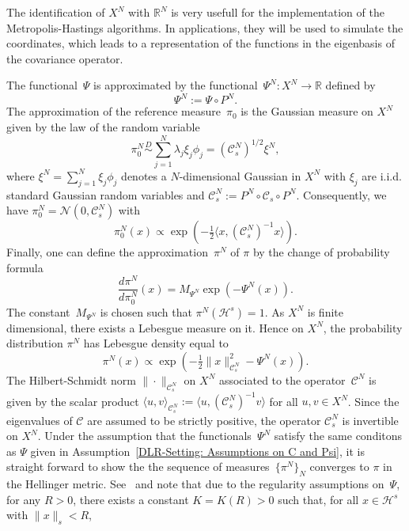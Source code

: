 \begin{rem}
 The identification of $X^N$ with $\mathbb{R}^N$ is very usefull for the implementation of the Metropolis-Hastings algorithms. In applications, they will be used to simulate the coordinates, which leads to a representation of the functions in the eigenbasis of the covariance operator.
\end{rem}

The functional~$\Psi$ is approximated by the functional~$\Psi^N : X^N \to \mathbb{R}$ defined by
\begin{equation}
\label{DLR-Setting: Definition Psi^N}
 \Psi^N := \Psi \circ P^N.
\end{equation}
The approximation of the reference measure~$\pi_0$ is the Gaussian measure on $X^N$ given by the law of the random variable
\begin{equation*}
 \pi^N_0 \stackrel{D}{\sim} \sum_{j=1}^{N} \lambda_j \xi_j \phi_j = (\mathcal{C}^N_s)^{1/2} \xi^N, 
\end{equation*}
where $\xi^N = \sum_{j=1}^{N} \xi_j \phi_j$ denotes a $N$-dimensional Gaussian in $X^N$ with $\xi_j$ are i.i.d.\,standard Gaussian random variables and  $\mathcal{C}_s^N :=P^N \circ \mathcal{C}_s \circ P^N $. Consequently, we have $\pi_0^N = \mathcal{N}(0, \mathcal{C}_s^N)$ with
\begin{equation*}
 \pi_0^N (x) \varpropto \exp (- \tfrac{1}{2} \langle x, (\mathcal{C}^N_s)^{-1} x \rangle).
\end{equation*}
Finally, one can define the approximation~$\pi^N$ of $\pi$ by the change of probability formula
\begin{equation}
\label{DLR-Setting: Definition of pi^N}
 \frac{d \pi^N}{d \pi_0^N} (x) = M_{\Psi^N} \exp (- \Psi^N (x)).
\end{equation}
The constant~$M_{\Psi^N}$ is chosen such that $\pi^N (\mathcal{H}^s) =1$. As $X^N$ is finite dimensional, there exists a Lebesgue measure on it. Hence on $X^{N}$, the probability distribution $\pi^{N}$ has Lebesgue density equal to
\begin{equation}
\label{DLR-Setting: Definition finite dim target measure pi^N}
 \pi^N (x) \varpropto \exp (-\tfrac{1}{2} \| x \|^2_{\mathcal{C}_s^N} - \Psi^N (x)).
\end{equation}
The Hilbert-Schmidt norm  $ \| \cdot \|_{\mathcal{C}_s^{N}} $ on $X^{N}$ associated to the operator~$\mathcal{C}^N$ is given by the scalar product $ \langle u, v \rangle_{\mathcal{C}_s^{N}} := \langle u, ( \mathcal{C}_s^{N} )^{-1} v \rangle $ for all $ u,v \in X^{N} $. Since the eigenvalues of $ \mathcal{C} $ are assumed to be strictly positive, the operator $ \mathcal{C}_s^{N} $ is invertible on $X^{N}$. Under the assumption that the functionals~$\Psi^N$ satisfy the same conditons as $\Psi$ given in Assumption~\ref{DLR-Setting: Assumptions on C and Psi}, it is straight forward to show the the sequence of measures~$\{ \pi^N \}_N$ converges to $\pi$ in the Hellinger metric. See~\autocite[Theorem 2.6]{Cotter2010} and note that due to the regularity assumptions on~$\Psi$, for any $R>0$, there exists a constant $K=K(R)>0$ such that, for all $x\in \mathcal{H}^s$ with $\|x\|_s < R$,
